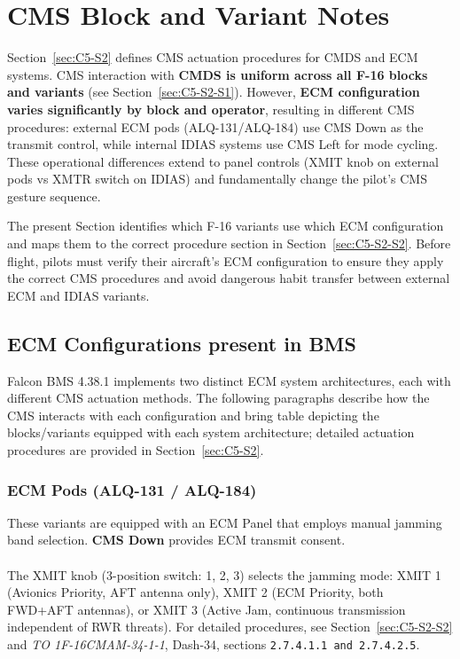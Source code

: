 \documentclass[11pt, a4paper, twoside]{report}
\providecommand{\dashrefs}[1]{\textit{TO 1F-16CMAM-34-1-1}, Dash-34, sections \texttt{#1}}
\begin{document}
\section{CMS Block and Variant Notes}
\label{sec:C5-S3}

Section~\ref{sec:C5-S2} defines CMS actuation procedures for CMDS and ECM systems. 
CMS interaction with \textbf{CMDS is uniform across all F-16 blocks and variants} (see Section~\ref{sec:C5-S2-S1}). However, \textbf{ECM configuration varies significantly by block and operator}, resulting in different CMS procedures: external ECM pods (ALQ-131/ALQ-184) use CMS Down as the transmit control, while internal IDIAS systems use CMS Left for mode cycling. These operational differences extend to panel controls (XMIT knob on external pods vs XMTR switch on IDIAS) and fundamentally change the pilot's CMS gesture sequence.

The present Section identifies which F-16 variants use which ECM configuration and maps them to the correct procedure section in Section~\ref{sec:C5-S2-S2}. Before flight, pilots must verify their aircraft's ECM configuration to ensure they apply the correct CMS procedures and avoid dangerous habit transfer between external ECM and IDIAS variants.

\subsection{ECM Configurations present in BMS}
\label{sec:C5-S3-S1}

Falcon BMS 4.38.1 implements two distinct ECM system architectures, each with different CMS actuation methods. The following paragraphs describe how the CMS interacts with each configuration and bring table depicting the blocks/variants equipped with each system architecture; detailed actuation procedures are provided in Section~\ref{sec:C5-S2}.

\subsubsection{ECM Pods (ALQ-131 / ALQ-184)}
\label{sec:C5-S3-S1-S1}

These variants are equipped with an ECM Panel that employs manual jamming band selection. \textbf{CMS Down} provides ECM transmit consent.\\\\
The XMIT knob (3-position switch: 1, 2, 3) selects the jamming mode: XMIT 1 (Avionics Priority, AFT antenna only), XMIT 2 (ECM Priority, both FWD+AFT antennas), or XMIT 3 (Active Jam, continuous transmission independent of RWR threats). For detailed procedures, see Section~\ref{sec:C5-S2-S2} and \dashrefs{2.7.4.1.1 and 2.7.4.2.5}.
\end{document}
